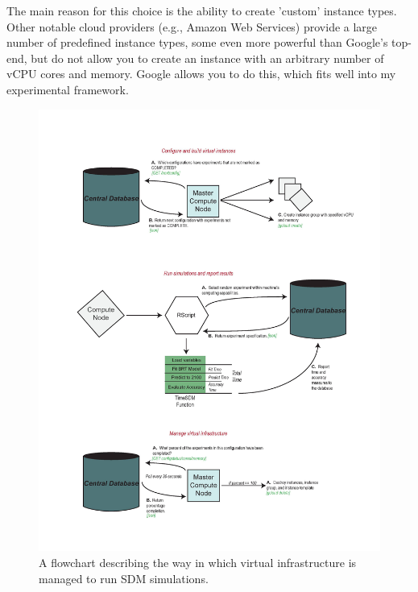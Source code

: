 \documentclass[a4paper]{article}
\begin{document}
The main reason for this choice is the ability to create 'custom' instance types.  Other notable cloud providers (e.g., Amazon Web Services) provide a large number of predefined instance types, some even more powerful than Google's top-end, but do not allow you to create an instance with an arbitrary number of vCPU cores and memory.  Google allows you to do this, which fits well into my experimental framework.

\begin{figure}
\includegraphics[width=1.1\textwidth]{file-page1.jpg}
\caption{A flowchart describing the way in which virtual infrastructure is managed to run SDM simulations.}\label{fig:flowchart}
\end{figure}
\end{document}
